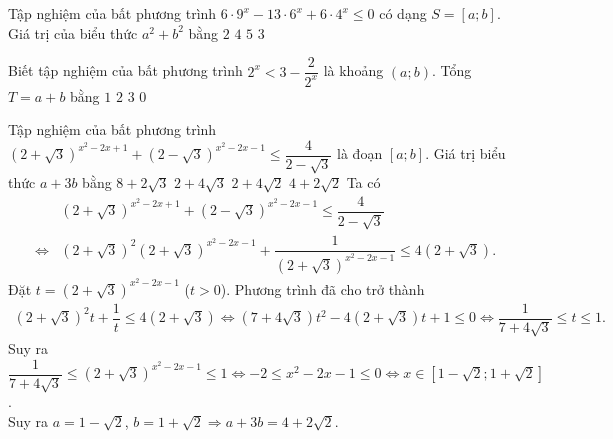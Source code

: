 \begin{ex}%
	Tập nghiệm của bất phương trình $6\cdot 9^x-13\cdot 6^x+6\cdot 4^x\le 0$ có dạng $S=[a;b]$. Giá trị của biểu thức $a^2+b^2$ bằng
	\choice
	{\True $2$}
	{$4$}
	{$5$}
	{$3$}
\end{ex}



\begin{ex}%
	Biết tập nghiệm của bất phương trình $2^x<3-\dfrac{2}{2^x}$ là khoảng $(a;b)$. Tổng $T=a+b$ bằng
	\choice
	{\True $1$}
	{$2$}
	{$3$}
	{$0$}
\end{ex}
\begin{ex}%
	Tập nghiệm của bất phương trình $\left(2+\sqrt{3}\right)^{x^2 - 2x + 1} + \left(2-\sqrt{3}\right)^{x^2 - 2x - 1}\leq\dfrac{4}{2 - \sqrt{3}}$ là đoạn $[a;b]$. Giá trị biểu thức $a+3b$ bằng
	\choice
	{$8+2\sqrt{3}$}
	{$2+4\sqrt{3}$}
	{$2+4\sqrt{2}$}
	{\True $4+2\sqrt{2}$}
	\loigiai
	{
		Ta có
		\begin{eqnarray*}
			&&\left(2+\sqrt{3}\right)^{x^2 - 2x + 1} + \left(2-\sqrt{3}\right)^{x^2 - 2x - 1}\leq\dfrac{4}{2 - \sqrt{3}}\\
			&\Leftrightarrow& \left(2+\sqrt{3}\right)^2\left(2 + \sqrt{3}\right)^{x^2 - 2x - 1} + \dfrac{1}{(2 + \sqrt{3})^{x^2 - 2x - 1}}\leq 4(2+\sqrt{3}).
		\end{eqnarray*}
		Đặt $t=\left(2+\sqrt{3}\right)^{x^2-2x-1}$ ($t>0$). Phương trình đã cho trở thành
		\begin{align*}
			\left(2+\sqrt{3}\right)^2 t+\dfrac{1}{t}\le 4\left(2+\sqrt{3}\right)\Leftrightarrow \left(7+4\sqrt{3}\right)t^2-4\left(2+\sqrt{3}\right)t+1\le 0\Leftrightarrow \dfrac{1}{7+4\sqrt{3}}\le t\le 1. 
		\end{align*}
		Suy ra $\dfrac{1}{7+4\sqrt{3}}\le \left(2+\sqrt{3}\right)^{x^2-2x-1}\le 1\Leftrightarrow -2\le x^2-2x-1\le 0\Leftrightarrow x\in \left[1-\sqrt{2};1+\sqrt{2}\right]$.\\
		Suy ra $a=1-\sqrt{2}$, $b=1+\sqrt{2}\Rightarrow a+3b=4+2\sqrt{2}$.
	}
\end{ex}


